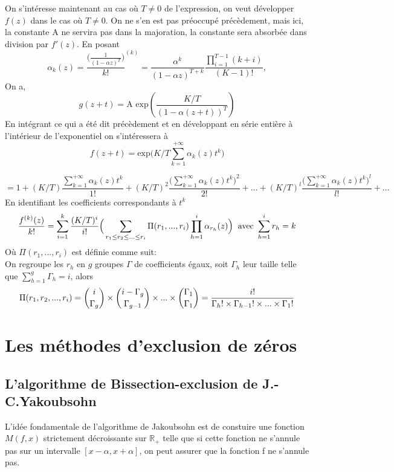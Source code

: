 \documentclass[a4paper,10.5pt]{article}
\begin{document}
	\vspace{1cm} 
	
	On s'intéresse maintenant au cas où $T\neq 0$ de l'expression, on veut développer $f(z)$ dans le cas où $T \neq 0$. On ne s'en est pas préoccupé précèdement, mais ici, la constante A ne servira pas dans la majoration, la constante sera absorbée dans division par $f'(z)$. En posant \[\alpha_{k}(z)=\frac{\big(\frac{1}{(1-\alpha z)^{T}}\big)}{k!}^{(k)}=\frac{\alpha^{k}}{(1-\alpha z)^{T+k}} \frac{\prod_{i=1}^{T-1}(k+i)}{(K-1)!},\] On a,
	\[g(z+t)=\text{A exp}(\frac{K/T}{(1-\alpha (z+t))^{T}})\]
	En intégrant ce qui a été dit précèdement et en développant en série entière à l'intérieur de l'exponentiel on s'intéressera à
	\[f(z+t)=\text{exp}\Big(K/T \sum_{k=1}^{+\infty}\alpha_{k}(z)t^{k} \Big)\]
	
	\[= 1+(K/T)\frac{\sum_{k=1}^{+\infty}\alpha_{k}(z)t^{k}}{1!}+(K/T)^{2}\frac{\big(\sum_{k=1}^{+\infty}\alpha_{k}(z)t^{k}\big)^{2}}{2!}+...+(K/T)^{l}\frac{\big(\sum_{k=1}^{+\infty}\alpha_{k}(z)t^{k}\big)^{l}}{l!}+...\]
	En identifiant les coefficients correspondants à $t^{k}$
	\[\frac{f^{(k)}(z)}{k!}=\sum_{i=1}^{k}\frac{(K/T)^{i}}{i!}\Big(\sum_{r_{1}\leq r_{2}\leq ...\leq{r_{i}}}\Pi(r_{1},...,r_{i})\prod_{h=1}^{i}\alpha_{r_{h}}(z) \Big) \hspace{2mm} \text{avec }\sum_{h=1}^{i} r_{h}=k\]
	Où $\Pi(r_{1},...,r_{i})$ est définie comme suit:\\
	On regroupe les $r_{h}$ en $g$ groupes $\Gamma$ de coefficients égaux, soit $\Gamma_{h}$ leur taille telle que $\sum_{h=1}^{g}\Gamma_{h}=i$, alors
	\[\Pi(r_{1},r_{2},...,r_{i})=\dbinom{i}{\Gamma_{g}}\times \dbinom{i-\Gamma_{g}}{\Gamma_{g-1}}\times ...\times \dbinom{\Gamma_{1}}{\Gamma_{1}}=\frac{i!}{\Gamma_h! \times \Gamma_{h-1}! \times ... \times \Gamma_1!}\]
	
	
	\newpage
	\section{Les méthodes d'exclusion de zéros}
	\subsection{L'algorithme de Bissection-exclusion de J.-C.Yakoubsohn}
	L'idée fondamentale de l'algorithme de Jakoubsohn est de constuire une fonction $M(f,x)$ strictement décroissante sur $\mathbb{R}_+$ telle que si cette fonction ne s'annule pas sur un intervalle $[x-\alpha,x+\alpha]$, on peut assurer que la fonction f ne s'annule pas.
	
\end{document}
